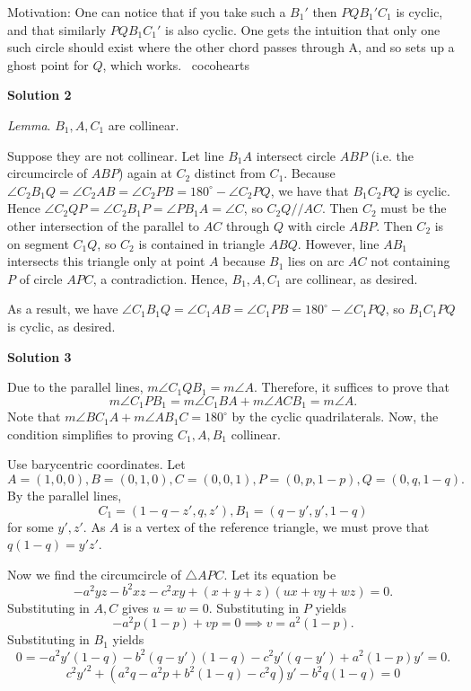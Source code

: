 \begin{enumerate}
 Motivation: One can notice that if you take such a $B_1'$ then $PQB_1'C_1$ is cyclic, and that similarly $PQB_1C_1'$ is also cyclic. One gets the intuition that only one such circle should exist where the other chord passes through A, and so sets up a ghost point for $Q$, which works. ~cocohearts

 



\textbf{Solution 2}

\textit{Lemma}. $B_1, A, C_1$ are collinear.

 Suppose they are not collinear. Let line $B_1 A$ intersect circle $ABP$ (i.e. the circumcircle of $ABP$) again at $C_2$ distinct from $C_1$. Because $\angle C_2 B_1 Q = \angle C_2 AB = \angle C_2 PB = 180^\circ - \angle C_2 PQ$, we have that $B_1 C_2 PQ$ is cyclic. Hence $\angle C_2 QP = \angle C_2 B_1 P = \angle P B_1 A = \angle C$, so $C_2 Q // AC$. Then $C_2$ must be the other intersection of the parallel to $AC$ through $Q$ with circle $ABP$. Then $C_2$ is on segment $C_1 Q$, so $C_2$ is contained in triangle $ABQ$. However, line $AB_1$ intersects this triangle only at point $A$ because $B_1$ lies on arc $AC$ not containing $P$ of circle $APC$, a contradiction. Hence, $B_1, A, C_1$ are collinear, as desired.

 As a result, we have $\angle C_1 B_1 Q = \angle C_1 AB = \angle C_1 PB = 180^\circ - \angle C_1 PQ$, so $B_1 C_1 PQ$ is cyclic, as desired.

 



\textbf{Solution 3}

Due to the parallel lines, $m\angle C_1QB_1=m\angle A.$ Therefore, it suffices to prove that 
 \[m\angle C_1PB_1=m\angle C_1BA+m\angle ACB_1=m\angle A.\] Note that $m\angle BC_1A+m\angle AB_1C=180^{\circ}$ by the cyclic quadrilaterals. Now, the condition simplifies to proving $C_1,A,B_1$ collinear.

 Use barycentric coordinates. Let 
 \[A=(1,0,0), B=(0,1,0), C=(0,0,1), P=(0,p,1-p), Q=(0,q,1-q).\] By the parallel lines, 
 \[C_1=(1-q-z',q,z'), B_1=(q-y',y',1-q)\] for some $y',z'.$ As $A$ is a vertex of the reference triangle, we must prove that $q(1-q)=y'z'.$

 Now we find the circumcircle of $\triangle APC.$ Let its equation be 
 \[-a^2yz-b^2xz-c^2xy+(x+y+z)(ux+vy+wz)=0.\] Substituting in $A,C$ gives $u=w=0.$ Substituting in $P$ yields 
 \[-a^2p(1-p)+vp=0\implies v = a^2(1-p).\] Substituting in $B_1$ yields
 \[0=-a^2y'(1-q)-b^2(q-y')(1-q)-c^2y'(q-y')+a^2(1-p)y'=0.\]
 \[c^2y'^2+(a^2q-a^2p+b^2(1-q)-c^2q)y'-b^2q(1-q)=0\]


\end{enumerate}
